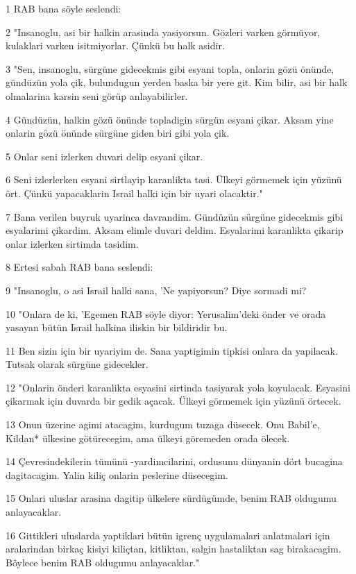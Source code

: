 \par 1 RAB bana söyle seslendi:
\par 2 "Insanoglu, asi bir halkin arasinda yasiyorsun. Gözleri varken görmüyor, kulaklari varken isitmiyorlar. Çünkü bu halk asidir.
\par 3 "Sen, insanoglu, sürgüne gidecekmis gibi esyani topla, onlarin gözü önünde, gündüzün yola çik, bulundugun yerden baska bir yere git. Kim bilir, asi bir halk olmalarina karsin seni görüp anlayabilirler.
\par 4 Gündüzün, halkin gözü önünde topladigin sürgün esyani çikar. Aksam yine onlarin gözü önünde sürgüne giden biri gibi yola çik.
\par 5 Onlar seni izlerken duvari delip esyani çikar.
\par 6 Seni izlerlerken esyani sirtlayip karanlikta tasi. Ülkeyi görmemek için yüzünü ört. Çünkü yapacaklarin Israil halki için bir uyari olacaktir."
\par 7 Bana verilen buyruk uyarinca davrandim. Gündüzün sürgüne gidecekmis gibi esyalarimi çikardim. Aksam elimle duvari deldim. Esyalarimi karanlikta çikarip onlar izlerken sirtimda tasidim.
\par 8 Ertesi sabah RAB bana seslendi:
\par 9 "Insanoglu, o asi Israil halki sana, 'Ne yapiyorsun? Diye sormadi mi?
\par 10 "Onlara de ki, 'Egemen RAB söyle diyor: Yerusalim'deki önder ve orada yasayan bütün Israil halkina iliskin bir bildiridir bu.
\par 11 Ben sizin için bir uyariyim de. Sana yaptigimin tipkisi onlara da yapilacak. Tutsak olarak sürgüne gidecekler.
\par 12 "Onlarin önderi karanlikta esyasini sirtinda tasiyarak yola koyulacak. Esyasini çikarmak için duvarda bir gedik açacak. Ülkeyi görmemek için yüzünü örtecek.
\par 13 Onun üzerine agimi atacagim, kurdugum tuzaga düsecek. Onu Babil'e, Kildan* ülkesine götürecegim, ama ülkeyi göremeden orada ölecek.
\par 14 Çevresindekilerin tümünü -yardimcilarini, ordusunu dünyanin dört bucagina dagitacagim. Yalin kiliç onlarin peslerine düsecegim.
\par 15 Onlari uluslar arasina dagitip ülkelere sürdügümde, benim RAB oldugumu anlayacaklar.
\par 16 Gittikleri uluslarda yaptiklari bütün igrenç uygulamalari anlatmalari için aralarindan birkaç kisiyi kiliçtan, kitliktan, salgin hastaliktan sag birakacagim. Böylece benim RAB oldugumu anlayacaklar."
